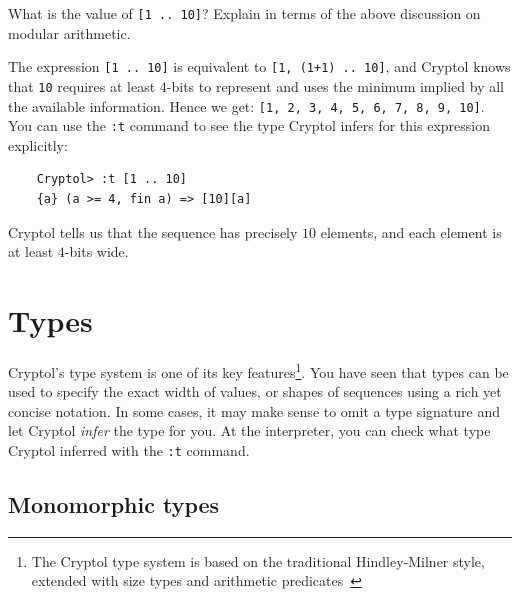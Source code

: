 \begin{Exercise}\label{ex:arith:10}
  What is the value of {\tt [1 .. 10]}? Explain in terms of the above
  discussion on modular arithmetic.\indModular
\end{Exercise}
\begin{Answer}
  The expression {\tt [1 .. 10]} is equivalent to {\tt [1, (1+1)
    .. 10]}, and Cryptol knows that {\tt 10} requires at least 4-bits
  to represent and uses the minimum implied by all the available
  information. Hence we get: {\tt [1, 2, 3, 4, 5, 6, 7, 8, 9, 10]}.
  You can use the {\tt :t} command to see the type Cryptol infers for
  this expression explicitly:
\begin{Verbatim}
    Cryptol> :t [1 .. 10]
    {a} (a >= 4, fin a) => [10][a]
\end{Verbatim}
Cryptol tells us that the sequence has precisely $10$ elements, and each
element is at least $4$-bits wide.
\end{Answer}

\section{Types}
\label{sec:types}

Cryptol's type system is one of its key features\footnote{The Cryptol
  type system is based on the traditional Hindley-Milner style,
  extended with size types and arithmetic
  predicates~\cite{erkok-carlsson-wick-cryptolCoverification-09,
    erkok-matthews-cryptolEqChecking-09, Hin97}}.  You have seen that
types can be used to specify the exact width of values, or shapes of
sequences using a rich yet concise notation.  In some cases, it may
make sense to omit a type signature and let Cryptol {\em infer} the
type for you. At the interpreter, you can check what type Cryptol
inferred with the {\tt :t} command.


\subsection{Monomorphic types}\indMonomorphism
\label{sec:monomorphic-types}

